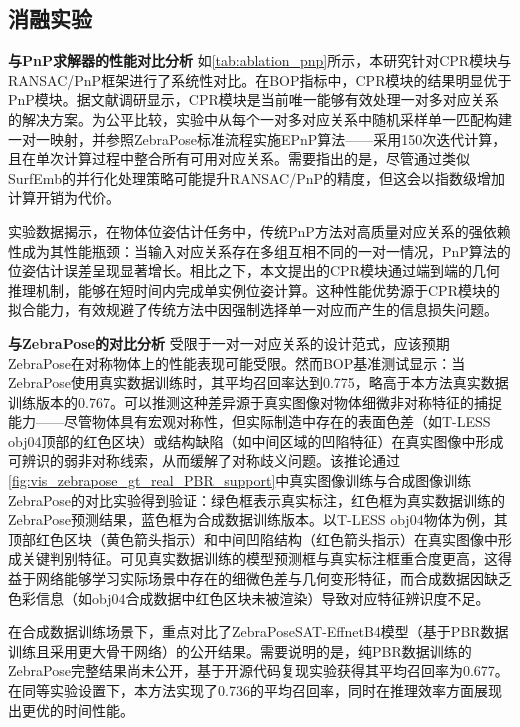 

\subsection{消融实验}

\textbf{与PnP求解器的性能对比分析 } 如\autoref{tab:ablation_pnp}所示，本研究针对CPR模块与RANSAC/PnP框架进行了系统性对比。在BOP指标中，CPR模块的结果明显优于PnP模块。据文献调研显示，CPR模块是当前唯一能够有效处理一对多对应关系的解决方案。为公平比较，实验中从每个一对多对应关系中随机采样单一匹配构建一对一映射，并参照ZebraPose标准流程实施EPnP算法\cite{EPnP}——采用150次迭代计算，且在单次计算过程中整合所有可用对应关系。需要指出的是，尽管通过类似SurfEmb的并行化处理策略可能提升RANSAC/PnP的精度，但这会以指数级增加计算开销为代价。

\par 实验数据揭示，在物体位姿估计任务中，传统PnP方法对高质量对应关系的强依赖性成为其性能瓶颈：当输入对应关系存在多组互相不同的一对一情况，PnP算法的位姿估计误差呈现显著增长。相比之下，本文提出的CPR模块通过端到端的几何推理机制，能够在短时间内完成单实例位姿计算。这种性能优势源于CPR模块的拟合能力，有效规避了传统方法中因强制选择单一对应而产生的信息损失问题。



\textbf{与ZebraPose的对比分析 } 受限于一对一对应关系的设计范式，应该预期ZebraPose在对称物体上的性能表现可能受限。然而BOP基准测试显示：当ZebraPose使用真实数据训练时，其平均召回率达到0.775，略高于本方法真实数据训练版本的0.767。可以推测这种差异源于真实图像对物体细微非对称特征的捕捉能力——尽管物体具有宏观对称性，但实际制造中存在的表面色差（如T-LESS obj04顶部的红色区块）或结构缺陷（如中间区域的凹陷特征）在真实图像中形成可辨识的弱非对称线索，从而缓解了对称歧义问题。该推论通过\autoref{fig:vis_zebrapose_gt_real_PBR_support}中真实图像训练与合成图像训练ZebraPose的对比实验得到验证：绿色框表示真实标注，红色框为真实数据训练的ZebraPose预测结果，蓝色框为合成数据训练版本。以T-LESS obj04物体为例，其顶部红色区块（黄色箭头指示）和中间凹陷结构（红色箭头指示）在真实图像中形成关键判别特征。可见真实数据训练的模型预测框与真实标注框重合度更高，这得益于网络能够学习实际场景中存在的细微色差与几何变形特征，而合成数据因缺乏色彩信息（如obj04合成数据中红色区块未被渲染）导致对应特征辨识度不足。

\par 在合成数据训练场景下，重点对比了ZebraPoseSAT-EffnetB4模型（基于PBR数据训练且采用更大骨干网络）的公开结果。需要说明的是，纯PBR数据训练的ZebraPose完整结果尚未公开，基于开源代码复现实验获得其平均召回率为0.677。在同等实验设置下，本方法实现了0.736的平均召回率，同时在推理效率方面展现出更优的时间性能。

